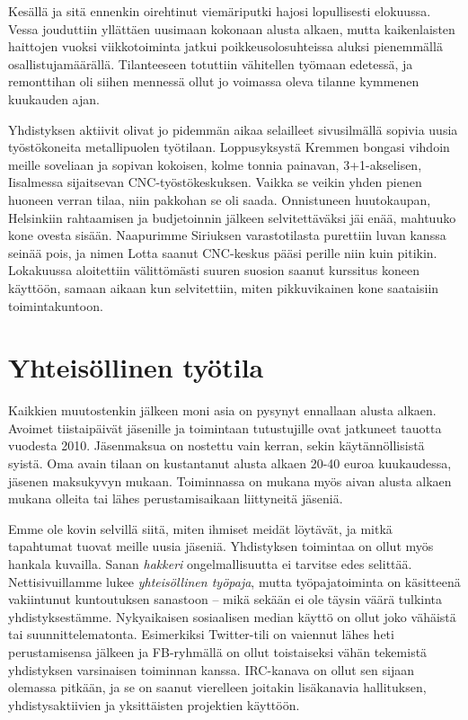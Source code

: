\documentclass[a4paper]{memoir}
\begin{document}
Kesällä ja sitä ennenkin oirehtinut viemäriputki hajosi lopullisesti elokuussa. Vessa jouduttiin yllättäen uusimaan kokonaan alusta alkaen, mutta kaikenlaisten haittojen vuoksi viikkotoiminta jatkui poikkeusolosuhteissa aluksi pienemmällä osallistujamäärällä. Tilanteeseen totuttiin vähitellen työmaan edetessä, ja remonttihan oli siihen mennessä ollut jo voimassa oleva tilanne kymmenen kuukauden ajan.

Yhdistyksen aktiivit olivat jo pidemmän aikaa selailleet sivusilmällä sopivia uusia työstökoneita metallipuolen työtilaan. Loppusyksystä Kremmen bongasi vihdoin meille soveliaan ja sopivan kokoisen, kolme tonnia painavan, 3+1-akselisen, Iisalmessa sijaitsevan CNC-työstökeskuksen. Vaikka se veikin yhden pienen huoneen verran tilaa, niin pakkohan se oli saada. Onnistuneen huutokaupan, Helsinkiin rahtaamisen ja budjetoinnin jälkeen selvitettäväksi jäi enää, mahtuuko kone ovesta sisään. Naapurimme Siriuksen varastotilasta purettiin luvan kanssa seinää pois, ja nimen Lotta saanut CNC-keskus pääsi perille niin kuin pitikin. Lokakuussa aloitettiin välittömästi suuren suosion saanut kurssitus koneen käyttöön, samaan aikaan kun selvitettiin, miten pikkuvikainen kone saataisiin toimintakuntoon.

\section*{Yhteisöllinen työtila}

Kaikkien muutostenkin jälkeen moni asia on pysynyt ennallaan alusta alkaen. Avoimet tiistaipäivät jäsenille ja toimintaan tutustujille ovat jatkuneet tauotta vuodesta 2010. Jäsenmaksua on nostettu vain kerran, sekin käytännöllisistä syistä. Oma avain tilaan on kustantanut alusta alkaen 20-40 euroa kuukaudessa, jäsenen maksukyvyn mukaan. Toiminnassa on mukana myös aivan alusta alkaen mukana olleita tai lähes perustamisaikaan liittyneitä jäseniä. 

Emme ole kovin selvillä siitä, miten ihmiset meidät löytävät, ja mitkä tapahtumat tuovat meille uusia jäseniä. Yhdistyksen toimintaa on ollut myös hankala kuvailla. Sanan \textit{hakkeri} ongelmallisuutta ei tarvitse edes selittää. Nettisivuillamme lukee \textit{yhteisöllinen työpaja}, mutta työpajatoiminta on käsitteenä vakiintunut kuntoutuksen sanastoon -- mikä sekään ei ole täysin väärä tulkinta yhdistyksestämme. Nykyaikaisen sosiaalisen median käyttö on ollut joko vähäistä tai suunnittelematonta. Esimerkiksi Twitter-tili on vaiennut lähes heti perustamisensa jälkeen ja FB-ryhmällä on ollut toistaiseksi vähän tekemistä yhdistyksen varsinaisen toiminnan kanssa. IRC-kanava on ollut sen sijaan olemassa pitkään, ja se on saanut vierelleen joitakin lisäkanavia hallituksen, yhdistysaktiivien ja yksittäisten projektien käyttöön.
\end{document}
